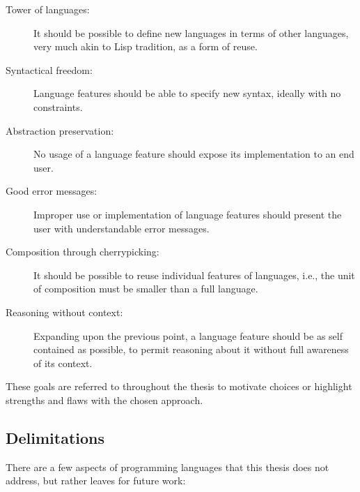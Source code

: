 \documentclass{kththesis}
\begin{document}
\begin{description}
  \item[Tower of languages:] It should be possible to define new languages in terms of other languages, very much akin to Lisp tradition, as a form of reuse.
  \item[Syntactical freedom:] Language features should be able to specify new syntax, ideally with no constraints.
  \item[Abstraction preservation:] No usage of a language feature should expose its implementation to an end user.
  \item[Good error messages:] Improper use or implementation of language features should present the user with understandable error messages.
  \item[Composition through cherrypicking:] It should be possible to reuse individual features of languages, i.e., the unit of composition must be smaller than a full language.
  \item[Reasoning without context:] Expanding upon the previous point, a language feature should be as self contained as possible, to permit reasoning about it without full awareness of its context.
\end{description}

These goals are referred to throughout the thesis to motivate choices or highlight strengths and flaws with the chosen approach.

\subsection{Delimitations} \label{sec:delimitations}

There are a few aspects of programming languages that this thesis does not address, but rather leaves for future work:
\end{document}
